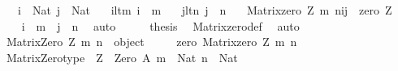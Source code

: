 \begin{isabellebody}
\ \ \ {\isachardoublequoteopen}i\ {\isacharcolon}{\kern0pt}\ Nat{\isachardoublequoteclose}\ {\isachardoublequoteopen}j\ {\isacharcolon}{\kern0pt}\ Nat{\isachardoublequoteclose}\isanewline
\ \ \ i{\isacharunderscore}{\kern0pt}lt{\isacharunderscore}{\kern0pt}m{\isacharcolon}{\kern0pt}\ {\isachardoublequoteopen}i\ {\isacharless}{\kern0pt}\ m{\isachardoublequoteclose}\isanewline
\ \ \ j{\isacharunderscore}{\kern0pt}lt{\isacharunderscore}{\kern0pt}n{\isacharcolon}{\kern0pt}\ {\isachardoublequoteopen}j\ {\isacharless}{\kern0pt}\ n{\isachardoublequoteclose}\isanewline
\ \ \ {\isachardoublequoteopen}{\isacharparenleft}{\kern0pt}Matrix{\isacharunderscore}{\kern0pt}zero\ Z\ m\ n{\isacharparenright}{\kern0pt}{\isacharbackquote}{\kern0pt}i{\isacharbackquote}{\kern0pt}j\ {\isacharequal}{\kern0pt}\ zero\ Z{\isachardoublequoteclose}\isanewline
%
\isadelimproof
%
\endisadelimproof
%
\isatagproof
{}\isamarkupfalse%
\ {\isacharminus}{\kern0pt}\isanewline
\isanewline
\ \ \isamarkupfalse%
\ {\isachardoublequoteopen}i\ {\isasymin}\ {\isacharbrackleft}{\kern0pt}{}{\isacharcomma}{\kern0pt}{\isasymdots}{\isacharcomma}{\kern0pt}m{\isacharbrackleft}{\kern0pt}{\isachardoublequoteclose}\ \ {\isachardoublequoteopen}j\ {\isasymin}\ {\isacharbrackleft}{\kern0pt}{}{\isacharcomma}{\kern0pt}{\isasymdots}{\isacharcomma}{\kern0pt}n{\isacharbrackleft}{\kern0pt}{\isachardoublequoteclose}\ \isamarkupfalse%
\ auto\isanewline
\ \ \isamarkupfalse%
\ \isamarkupfalse%
\ {\isacharquery}{\kern0pt}thesis\ \isamarkupfalse%
\ Matrix{\isacharunderscore}{\kern0pt}zero{\isacharunderscore}{\kern0pt}def\ \isamarkupfalse%
\ auto\isanewline
{}\isamarkupfalse%
%
\endisatagproof
{\isafoldproof}%
%
\isadelimproof
\isanewline
%
\endisadelimproof
\isanewline
\isanewline
{}\isamarkupfalse%
\ {\isachardoublequoteopen}Matrix{\isacharunderscore}{\kern0pt}Zero\ Z\ m\ n\ {\isasymequiv}\ object\ {\isacharbraceleft}{\kern0pt}\isanewline
\ \ \ \ {\isasymlangle}{\isacharat}{\kern0pt}zero{\isacharcomma}{\kern0pt}\ Matrix{\isacharunderscore}{\kern0pt}zero\ Z\ m\ n{\isasymrangle}\isanewline
\ \ {\isacharbraceright}{\kern0pt}{\isachardoublequoteclose}\isanewline
\isanewline
{}\isamarkupfalse%
\ Matrix{\isacharunderscore}{\kern0pt}Zero{\isacharunderscore}{\kern0pt}type{\isacharcolon}{\kern0pt}\ \ {\isachardoublequoteopen}Z\ {\isacharcolon}{\kern0pt}\ Zero\ A{\isachardoublequoteclose}\ {\isachardoublequoteopen}m\ {\isacharcolon}{\kern0pt}\ Nat{\isachardoublequoteclose}\ {\isachardoublequoteopen}n\ {\isacharcolon}{\kern0pt}\ Nat{\isachardoublequoteclose}\isanewline

\end{isabellebody}
